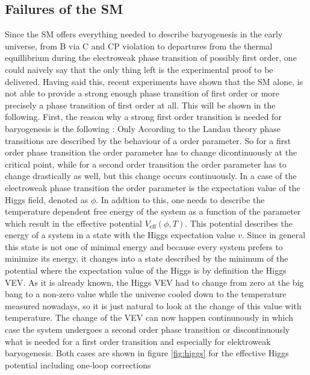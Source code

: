 \subsection{Failures of the SM}
Since the SM offers everything needed to describe baryogenesis in the early universe, from B via C and CP violation to departures from the thermal equillibrium during the electroweak phase transition of possibly first order, one could naively say that the only thing left is the experimental proof to be delivered. \newline\indent
Having said this, recent experiments have shown that the SM alone, is not able to provide a strong enough phase transition of first order or more precisely a phase transition of first order at all. This will be shown in the following. \newline\indent
First, the reason why a strong first order transition is needed for baryogenesis is the following \cite[p. 25]{Bernreuther:2002uj}: Only 
According to the Landau theory phase transitions are described by the behaviour of a order parameter. So for a first order phase transition the order parameter has to change dicontinuously at the critical point, while for a second order transition the order parameter has to change drastically as well, but this change occurs continuously. In a case of the electroweak phase transition the order parameter is the expectation value of the Higgs field, denoted as $\phi$. In addtion to this, one needs to describe the temperature dependent free energy of the system as a function of the parameter which result in the effective potential $V_\text{eff}(\phi,T)$. This potential describes the energy of a system in a state with the Higgs expectation value $v$. Since in general this state is not one of minimal energy and because every system prefers to minimize its energy, it changes into a state described by the minimum of the potential where the expectation value of the Higgs is by definition the Higgs VEV. \newline\indent
As it is already known, the Higgs VEV had to change from zero at the big bang to a non-zero value while the universe cooled down to the temperature measured nowadays, so it is just natural to look at the change of this value with temperature. The change of the VEV can now happen continunously in which case the system undergoes a second order phase transition or discontinuously what is needed for a first order transition and especially for elektroweak baryogenesis. 
Both cases are shown in figure \ref{fig:higgs} for the effective Higgs potential including one-loop corrections \cite{Petropoulos:2003pm}
